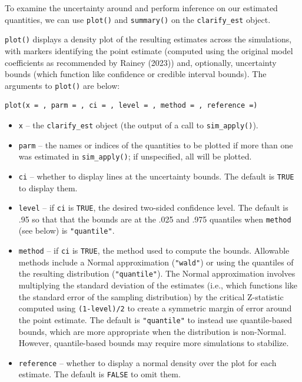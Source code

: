 To examine the uncertainty around and perform inference on our estimated quantities, we can use \texttt{plot()} and \texttt{summary()} on the \texttt{clarify\_est} object.

\texttt{plot()} displays a density plot of the resulting estimates across the simulations, with markers identifying the point estimate (computed using the original model coefficients as recommended by Rainey (2023)) and, optionally, uncertainty bounds (which function like confidence or credible interval bounds). The arguments to \texttt{plot()} are below:

\begin{verbatim}
plot(x = , parm = , ci = , level = , method = , reference =)
\end{verbatim}

\begin{itemize}
\item
  \texttt{x} -- the \texttt{clarify\_est} object (the output of a call to \texttt{sim\_apply()}).
\item
  \texttt{parm} -- the names or indices of the quantities to be plotted if more than one was estimated in \texttt{sim\_apply()}; if unspecified, all will be plotted.
\item
  \texttt{ci} -- whether to display lines at the uncertainty bounds. The default is \texttt{TRUE} to display them.
\item
  \texttt{level} -- if \texttt{ci} is \texttt{TRUE}, the desired two-sided confidence level. The default is .95 so that that the bounds are at the .025 and .975 quantiles when \texttt{method} (see below) is \texttt{"quantile"}.
\item
  \texttt{method} -- if \texttt{ci} is \texttt{TRUE}, the method used to compute the bounds. Allowable methods include a Normal approximation (\texttt{"wald"}) or using the quantiles of the resulting distribution (\texttt{"quantile"}). The Normal approximation involves multiplying the standard deviation of the estimates (i.e., which functions like the standard error of the sampling distribution) by the critical Z-statistic computed using \texttt{(1-level)/2} to create a symmetric margin of error around the point estimate. The default is \texttt{"quantile"} to instead use quantile-based bounds, which are more appropriate when the distribution is non-Normal. However, quantile-based bounds may require more simulations to stabilize.
\item
  \texttt{reference} -- whether to display a normal density over the plot for each estimate. The default is \texttt{FALSE} to omit them.
\end{itemize}

